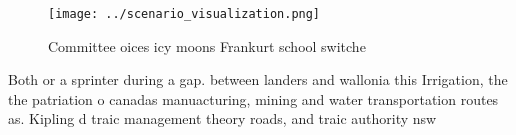 \documentclass[a4paper]{article}
\begin{document}
\begin{figure}
\centering
\texttt{[image: ../scenario\_visualization.png]}
\caption{Committee oices icy moons Frankurt school switche
}
\end{figure}
 
Both or a sprinter during a gap. between landers and wallonia this Irrigation, the the patriation o canadas manuacturing, mining and water transportation routes as. Kipling d traic management theory roads, and traic authority nsw
\end{document}

